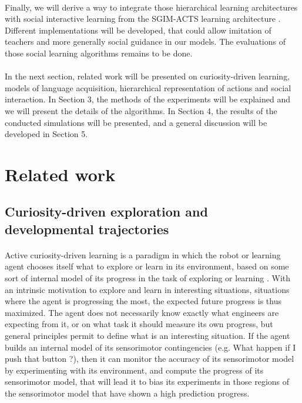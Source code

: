 \documentclass[12pt]{article}
\begin{document}
	
	\paragraph{}
	Finally, we will derive a way to integrate those hierarchical learning architectures with social interactive learning 
	from the SGIM-ACTS learning architecture \cite{nguyen2012}. 
	Different implementations will be developed, that could allow imitation of teachers and more generally social guidance in our models.
	The evaluations of those social learning algorithms remains to be done.
	
	\paragraph{}
	In the next section, related work will be presented on curiosity-driven learning, models of language acquisition, hierarchical representation of actions
	and social interaction.
	In Section 3, the methods of the experiments will be explained and we will present the details of the algorithms.
	In Section 4, the results of the conducted simulations will be presented, and a general discussion will be developed in Section 5.

%
	
\section{Related work}

	\subsection{Curiosity-driven exploration and developmental trajectories}
				
		
		\paragraph{}
		Active curiosity-driven learning is a paradigm in which the robot or learning agent chooses itself what to explore or learn in its environment, 
		based on some sort of internal model of its progress in the task of exploring or learning \cite{cangelosi2010integration}. 
		With an intrinsic motivation to explore and learn in interesting situations, situations where the agent is progressing the most, the expected future progress is thus maximized.
		The agent does not necessarily know exactly what engineers are expecting from it, or on what task it should measure its own progress, 
		but general principles permit to define what is an interesting situation. 
		If the agent builds an internal model of its sensorimotor contingencies (e.g. What happen if I push that button ?), then it can monitor the accuracy of its sensorimotor model
		by experimenting with its environment, and compute the progress of its sensorimotor model, that will lead it to bias its experiments in those regions of the sensorimotor 
		model that have shown a high prediction progress.
		
\end{document}
